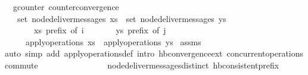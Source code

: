 \begin{isabellebody}
\isamarkupfalse%
\ {\isacharparenleft}\ gcounter{\isacharparenright}\ counter{\isacharunderscore}convergence{\isacharcolon}\isanewline
\ \ \ {\isachardoublequoteopen}set\ {\isacharparenleft}node{\isacharunderscore}deliver{\isacharunderscore}messages\ xs{\isacharparenright}\ {\isacharequal}\ set\ {\isacharparenleft}node{\isacharunderscore}deliver{\isacharunderscore}messages\ ys{\isacharparenright}{\isachardoublequoteclose}\isanewline
\ \ \ \ \ \ \ {\isachardoublequoteopen}xs\ prefix\ of\ i{\isachardoublequoteclose}\isanewline
\ \ \ \ \ \ \ {\isachardoublequoteopen}ys\ prefix\ of\ j{\isachardoublequoteclose}\isanewline
\ \ \ \ \ {\isachardoublequoteopen}apply{\isacharunderscore}operations\ xs\ {\isacharequal}\ apply{\isacharunderscore}operations\ ys{\isachardoublequoteclose}\isanewline
%
\isadelimproof
%
\endisadelimproof
%
\isatagproof
{}\isamarkupfalse%
\ assms\ \isamarkupfalse%
{\isacharparenleft}auto\ simp\ add{\isacharcolon}\ apply{\isacharunderscore}operations{\isacharunderscore}def\ intro{\isacharcolon}\ hb{\isachardot}convergence{\isacharunderscore}ext\ concurrent{\isacharunderscore}operations{\isacharunderscore}commute\isanewline
\ \ \ \ \ \ \ \ \ \ \ \ \ \ \ \ node{\isacharunderscore}deliver{\isacharunderscore}messages{\isacharunderscore}distinct\ hb{\isacharunderscore}consistent{\isacharunderscore}prefix{\isacharparenright}%
\endisatagproof
{\isafoldproof}%
%
\isadelimproof
%
\endisadelimproof
\end{isabellebody}%
